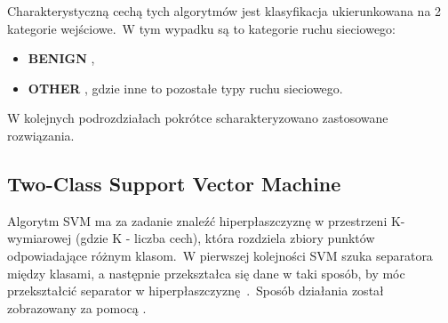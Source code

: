 Charakterystyczną cechą tych algorytmów jest klasyfikacja ukierunkowana na 2 kategorie wejściowe.\ W tym wypadku są to kategorie ruchu sieciowego:
\begin{itemize}
    \item \textbf{BENIGN} ,
    \item \textbf{OTHER} , gdzie inne to pozostałe typy ruchu sieciowego.
\end{itemize}

W kolejnych podrozdziałach pokrótce scharakteryzowano zastosowane rozwiązania.

\subsection{Two-Class Support Vector Machine}\label{subsec:svm}
Algorytm SVM ma za zadanie znaleźć hiperpłaszczyznę w przestrzeni K-wymiarowej (gdzie K - liczba cech), która rozdziela zbiory punktów odpowiadające różnym klasom.\ W pierwszej kolejności SVM szuka separatora między klasami, a następnie przekształca się dane w taki sposób, by móc przekształcić separator w hiperpłaszczyznę~\cite{IBM}.\ Sposób działania został zobrazowany za pomocą .

